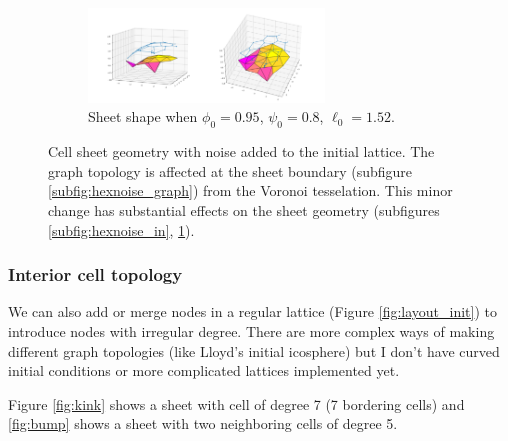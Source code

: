 \begin{figure}[htbp]
\begin{subfigure}[b]{\textwidth}
        \includegraphics[width=0.69\textwidth]{hexnoise/hexnoise0.95_0.8_1.52_10_plot.png}
        \caption{Sheet shape when $\phi_0=0.95$, $\psi_0=0.8$, $\ell_0=1.52$.}
        \label{subfig:hexnoise_out}
    \end{subfigure}
    \caption{Cell sheet geometry with noise added to the initial lattice. The graph topology is affected at the sheet boundary (subfigure \ref{subfig:hexnoise_graph}) from the Voronoi tesselation. This minor change has substantial effects on the sheet geometry (subfigures \ref{subfig:hexnoise_in}, \ref{subfig:hexnoise_out}).}
    \label{fig:hexnoise}
\end{figure}

\subsubsection{Interior cell topology}

We can also add or merge nodes in a regular lattice (Figure \ref{fig:layout_init}) to introduce nodes with irregular degree. There are more complex ways of making different graph topologies (like Lloyd's initial icosphere) but I don't have curved initial conditions or more complicated lattices implemented yet. 

Figure \ref{fig:kink} shows a sheet with cell of degree 7 (7 bordering cells) and \ref{fig:bump} shows a sheet with two neighboring cells of degree 5. 

